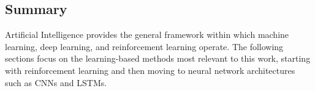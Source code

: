 \subsection{Summary}
\begin{flushleft}
Artificial Intelligence provides the general framework within which machine learning, deep learning, and reinforcement learning operate. The following sections focus on the learning-based methods most relevant to this work, starting with reinforcement learning and then moving to neural network architectures such as CNNs and LSTMs.
\end{flushleft}
